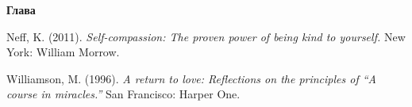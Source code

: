 \begin{thebibliography}{999}
	
	
	\vspace{3ex}
	\textbf{Глава }
	
	 Neff, K. (2011). \textit{Self-compassion: The proven power of being kind to yourself.} New York: William Morrow.
	
	 Williamson, M. (1996). \textit{A return to love: Reflections on the principles of “A course in miracles.”} San Francisco: Harper One.
	
\end{thebibliography}
